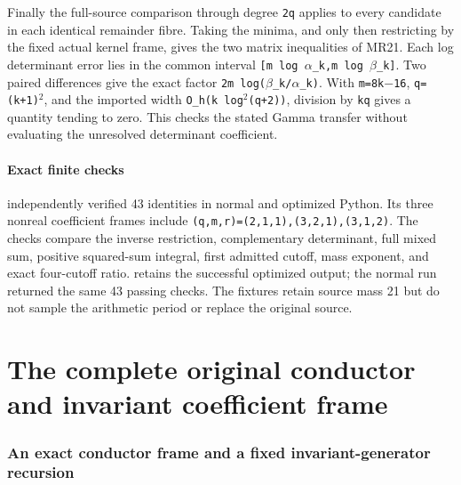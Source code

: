 \documentclass[11pt]{article}
\begin{document}
Finally the full-source comparison through degree \texttt{2q} applies to every candidate in each identical remainder fibre. Taking the minima, and only then restricting by the fixed actual kernel frame, gives the two matrix inequalities of MR21. Each log determinant error lies in the common interval \texttt{{[}m\ log\ \ensuremath{\alpha}\_k,m\ log\ \ensuremath{\beta}\_k{]}}. Two paired differences give the exact factor \texttt{2m\ log(\ensuremath{\beta}\_k/\ensuremath{\alpha}\_k)}. With \texttt{m=8k\ensuremath{-}16}, \texttt{q=(k+1)\ensuremath{{}^2}}, and the imported width \texttt{O\_h(k\ log\ensuremath{{}^2}(q+2))}, division by \texttt{kq} gives a quantity tending to zero. This checks the stated Gamma transfer without evaluating the unresolved determinant coefficient.

\subsection{Exact finite checks}\label{mrreview:exact-finite-checks}

 independently verified 43 identities in normal and optimized Python. Its three nonreal coefficient frames include \texttt{(q,m,r)=(2,1,1),(3,2,1),(3,1,2)}. The checks compare the inverse restriction, complementary determinant, full mixed sum, positive squared-sum integral, first admitted cutoff, mass exponent, and exact four-cutoff ratio.  retains the successful optimized output; the normal run returned the same 43 passing checks. The fixtures retain source mass 21 but do not sample the arithmetic period or replace the original source.

\endgroup

\clearpage\begingroup
\part*{The complete original conductor and invariant coefficient frame}
\providecommand{\mrocftightlist}{\setlength{\itemsep}{0pt}\setlength{\parskip}{0pt}}

\section{An exact conductor frame and a fixed invariant-generator recursion}
\label{mrocf:sec:OCF}
\end{document}
